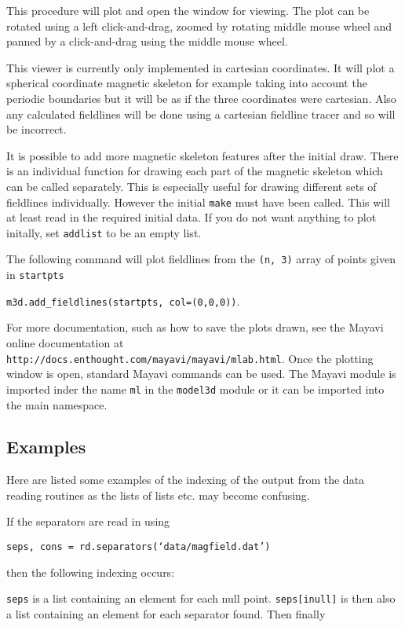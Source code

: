 \documentclass[12pt]{article}
\begin{document}
      This procedure will plot and open the window for viewing. The plot can be rotated using a left click-and-drag, zoomed by rotating middle mouse wheel and panned by a click-and-drag using the middle mouse wheel.

      This viewer is currently only implemented in cartesian coordinates. It will plot a spherical coordinate magnetic skeleton for example taking into account the periodic boundaries but it will be as if the three coordinates were cartesian. Also any calculated fieldlines will be done using a cartesian fieldline tracer and so will be incorrect.

      It is possible to add more magnetic skeleton features after the initial draw. There is an individual function for drawing each part of the magnetic skeleton which can be called separately. This is especially useful for drawing different sets of fieldlines individually. However the initial \texttt{make} must have been called. This will at least read in the required initial data. If you do not want anything to plot initally, set \texttt{addlist} to be an empty list.

      The following command will plot fieldlines from the \texttt{(n, 3)} array of points given in \texttt{startpts}
      
      \texttt{m3d.add\_fieldlines(startpts, col=(0,0,0))}.

      For more documentation, such as how to save the plots drawn, see the Mayavi online documentation at \texttt{http://docs.enthought.com/mayavi/mayavi/mlab.html}. Once the plotting window is open, standard Mayavi commands can be used. The Mayavi module is imported inder the name \texttt{ml} in the \texttt{model3d} module or it can be imported into the main namespace.

      \subsection{Examples}

      Here are listed some examples of the indexing of the output from the data reading routines as the lists of lists etc. may become confusing.

      If the separators are read in using
      
      \texttt{seps, cons = rd.separators(`data/magfield.dat')}
      
      then the following indexing occurs:
      
      \texttt{seps} is a list containing an element for each null point. \texttt{seps[inull]} is then also a list containing an element for each separator found. Then finally
\end{document}
